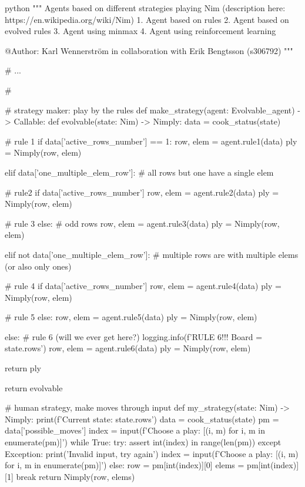 \begin{mintedbox}{python}
"""
Agents based on different strategies playing Nim (description here: https://en.wikipedia.org/wiki/Nim)
    1. Agent based on rules
    2. Agent based on evolved rules
    3. Agent using minmax
    4. Agent using reinforcement learning

@Author: Karl Wennerström in collaboration with Erik Bengtsson (s306792)
"""

# ...

# %

# strategy maker: play by the rules
def make_strategy(agent: Evolvable_agent) -> Callable:
    def evolvable(state: Nim) -> Nimply:
        data = cook_status(state)

        # rule 1
        if data['active_rows_number'] == 1:
            row, elem = agent.rule1(data)
            ply = Nimply(row, elem)

        elif data['one_multiple_elem_row']:  # all rows but one have a single elem

            # rule2
            if data['active_rows_number'] %
                row, elem = agent.rule2(data)
                ply = Nimply(row, elem)

            # rule 3
            else:  # odd rows
                row, elem = agent.rule3(data)
                ply = Nimply(row, elem)

        elif not data['one_multiple_elem_row']:  # multiple rows are with multiple elems (or also only ones)

            # rule 4
            if data['active_rows_number'] %
                row, elem = agent.rule4(data)
                ply = Nimply(row, elem)

            # rule 5
            else:
                row, elem = agent.rule5(data)
                ply = Nimply(row, elem)


        else:
            # rule 6 (will we ever get here?)
            logging.info(f'RULE 6!!! Board = {state.rows}')
            row, elem = agent.rule6(data)
            ply = Nimply(row, elem)

        return ply

    return evolvable


# human strategy, make moves through input
def my_strategy(state: Nim) -> Nimply:
    print(f'Current state: {state.rows}')
    data = cook_status(state)
    pm = data['possible_moves']
    index = input(f'Choose a play: {[(i, m) for i, m in enumerate(pm)]}')
    while True:
        try:
            assert int(index) in range(len(pm))
        except Exception:
            print('Invalid input, try again')
            index = input(f'Choose a play: {[(i, m) for i, m in enumerate(pm)]}')
        else:
            row = pm[int(index)][0]
            elems = pm[int(index)][1]
            break
    return Nimply(row, elems)



\end{mintedbox}
